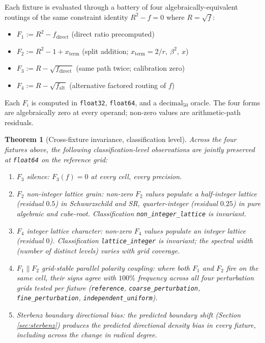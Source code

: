 \documentclass[11pt,a4paper]{article}
\newtheorem{theorem}{Theorem}
\begin{document}
Each fixture is evaluated through a battery of four algebraically-equivalent routings of the same constraint identity $R^2 - f = 0$ where $R = \sqrt{f}$:

\begin{itemize}
    \item $F_1 := R^2 - f_{\mathrm{direct}}$ \quad (direct ratio precomputed)
    \item $F_2 := R^2 - 1 + x_{\mathrm{term}}$ \quad (split addition; $x_{\mathrm{term}} = 2/r,\ \beta^2,\ x$)
    \item $F_3 := R - \sqrt{f_{\mathrm{direct}}}$ \quad (same path twice; calibration zero)
    \item $F_4 := R - \sqrt{f_{\mathrm{alt}}}$ \quad (alternative factored routing of $f$)
\end{itemize}

Each $F_i$ is computed in \texttt{float32}, \texttt{float64}, and a $\mathrm{decimal}_{50}$ oracle. The four forms are algebraically zero at every operand; non-zero values are arithmetic-path residuals.

\begin{theorem}[Cross-fixture invariance, classification level]\label{thm:cross-fixture}
Across the four fixtures above, the following classification-level observations are jointly preserved at \texttt{float64} on the reference grid:
\begin{enumerate}
    \item $F_3$ silence: $F_3(f) = 0$ at every cell, every precision.
    \item $F_2$ non-integer lattice grain: non-zero $F_2$ values populate a half-integer lattice (residual $0.5$) in Schwarzschild and SR, quarter-integer (residual $0.25$) in pure algebraic and cube-root. Classification \texttt{non\_integer\_lattice} is invariant.
    \item $F_4$ integer lattice character: non-zero $F_4$ values populate an integer lattice (residual $0$). Classification \texttt{lattice\_integer} is invariant; the spectral width (number of distinct levels) varies with grid coverage.
    \item $F_1 \parallel F_2$ grid-stable parallel polarity coupling: where both $F_1$ and $F_2$ fire on the same cell, their signs agree with $100\%$ frequency across all four perturbation grids tested per fixture (\texttt{reference}, \texttt{coarse\_perturbation}, \texttt{fine\_perturbation}, \texttt{independent\_uniform}).
    \item Sterbenz boundary directional bias: the predicted boundary shift (Section \ref{sec:sterbenz}) produces the predicted directional density bias in every fixture, including across the change in radical degree.
\end{enumerate}
\end{theorem}
\end{document}
